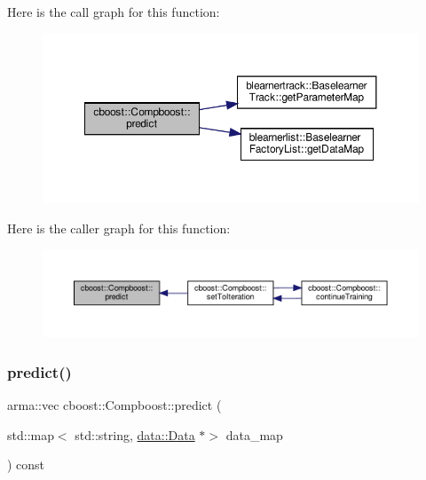 Here is the call graph for this function\+:\nopagebreak
\begin{figure}[H]
\begin{center}
\leavevmode
\includegraphics[width=350pt]{classcboost_1_1_compboost_a32d1066a24607ff6ef2f934002adf62b_cgraph}
\end{center}
\end{figure}
Here is the caller graph for this function\+:\nopagebreak
\begin{figure}[H]
\begin{center}
\leavevmode
\includegraphics[width=350pt]{classcboost_1_1_compboost_a32d1066a24607ff6ef2f934002adf62b_icgraph}
\end{center}
\end{figure}
\mbox{\label{classcboost_1_1_compboost_a1779a0c89cf9da32b250c0c083631c58}} 
\subsubsection{\texorpdfstring{predict()}{predict()}\hspace{0.1cm}{\footnotesize\ttfamily [2/2]}}
{\footnotesize\ttfamily arma\+::vec cboost\+::\+Compboost\+::predict (\begin{DoxyParamCaption}\item[{std\+::map$<$ std\+::string, \hyperlink{classdata_1_1_data}{data\+::\+Data} $\ast$$>$}]{data\+\_\+map }\end{DoxyParamCaption}) const}

